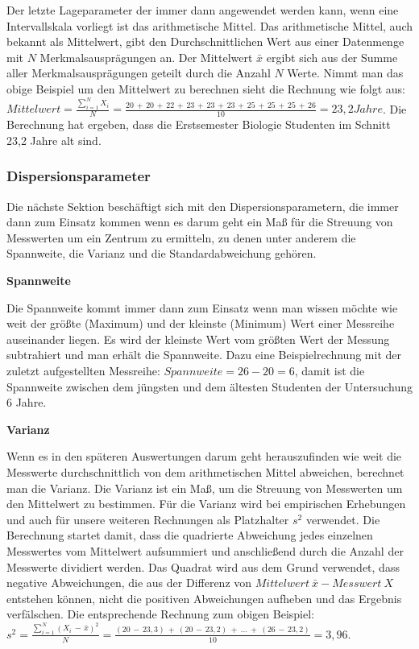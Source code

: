 Der letzte Lageparameter der immer dann angewendet werden kann, wenn eine Intervallskala vorliegt ist das arithmetische Mittel. Das arithmetische Mittel, auch bekannt als Mittelwert, gibt den Durchschnittlichen Wert aus einer Datenmenge mit $N$ Merkmalsausprägungen an. Der Mittelwert $\bar{x}$ ergibt sich aus der Summe aller Merkmalsausprägungen geteilt durch die Anzahl $N$ Werte. Nimmt man das obige Beispiel um den Mittelwert zu berechnen sieht die Rechnung wie folgt aus: \\
$Mittelwert = \frac{\sum \limits_{i=1}^N X_i}{N} = \frac{20\,+\,20\,+\,22\,+\,23\,+\,23\,+\,23\,+\,25\,+\,25\,+\,25\,+\,26}{10} = 23,2 Jahre$. Die Berechnung hat ergeben, dass die Erstsemester Biologie Studenten im Schnitt 23,2 Jahre alt sind.

\subsubsection{Dispersionsparameter}
Die nächste Sektion beschäftigt sich mit den Dispersionsparametern, die immer dann zum Einsatz kommen wenn es darum geht ein Maß für die Streuung von Messwerten um ein Zentrum zu ermitteln, zu denen unter anderem die Spannweite, die Varianz und die Standardabweichung gehören.

\textbf{Spannweite}

Die Spannweite kommt immer dann zum Einsatz wenn man wissen möchte wie weit der größte (Maximum) und der kleinste (Minimum) Wert einer Messreihe auseinander liegen. Es wird der kleinste Wert vom größten Wert der Messung subtrahiert und man erhält die Spannweite. Dazu eine Beispielrechnung mit der zuletzt aufgestellten Messreihe: $Spannweite = 26 - 20 = 6$, damit ist die Spannweite zwischen dem jüngsten und dem ältesten Studenten der Untersuchung 6 Jahre.

\textbf{Varianz}

Wenn es in den späteren Auswertungen darum geht herauszufinden wie weit die Messwerte durchschnittlich von dem arithmetischen Mittel abweichen, berechnet man die Varianz. Die Varianz ist ein Maß, um die Streuung von Messwerten um den Mittelwert zu bestimmen. Für die Varianz wird bei empirischen Erhebungen und auch für unsere weiteren Rechnungen als Platzhalter $s^2$ verwendet. Die Berechnung startet damit, dass die quadrierte Abweichung jedes einzelnen Messwertes vom Mittelwert aufsummiert und anschließend durch die Anzahl der Messwerte dividiert werden. Das Quadrat wird aus dem Grund verwendet, dass negative Abweichungen, die aus der Differenz von $Mittelwert\:\bar{x} - Messwert\:X $ entstehen können, nicht die positiven Abweichungen aufheben und das Ergebnis verfälschen. Die entsprechende Rechnung zum obigen Beispiel: \\
$s^2 = \frac{\sum \limits_{i=1}^N (X_i\,-\,\bar{x})^2}{N} = \frac{(20\,-\,23,3)\:+\:(20\,-\,23,2)\:+\:...\:+\:(26\,-\,23,2)}{10} = 3,96$. 

